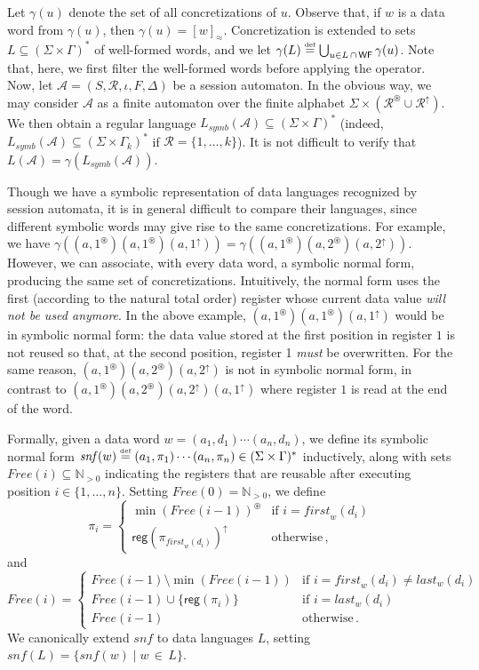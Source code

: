 \documentclass{LMCS}
\def\N{\ensuremath{\mathbb N}\xspace}
\def\Nz{\ensuremath{\N_{{}>0}}\xspace}
\newcommand\df{\ensuremath{\mathrel{\smash{\stackrel{\scriptscriptstyle{
    \text{def}}}{=}}}}}
\newcommand{\set}[1]{\{1,\ldots,#1\}}
\newcommand{\firstocc}[1]{\mathit{first}_{#1}}
\newcommand{\lastocc}[1]{\mathit{last}_{#1}}
\def\A{\mathcal A}
\newcommand{\Reg}{\mathcal{R}}
\newcommand{\rReg}{\Reg^\uparrow}
\newcommand{\gReg}{\Reg^\circledast}
\newcommand{\rreg}[1]{#1^\uparrow}
\newcommand{\gfresh}[1]{#1^\circledast}
\newcommand{\regof}[1]{\textsf{reg}(#1)}
\newcommand{\Reusable}{\mathit{Free}}
\newcommand{\fStates}{F}
\newcommand{\States}{S}
\newcommand{\init}{\iota}
\newcommand{\Trans}{\Delta}
\newcommand{\Nat}{\Gamma}
\newcommand{\kNat}[1]{\Gamma_{#1}}
\newcommand{\symbL}{L_\mathit{symb}}
\newcommand{\snf}{\mathit{snf}}
\newcommand{\DWords}{\gamma}
\newcommand{\DWordsof}[1]{\DWords(#1)}
\newcommand{\WF}{\mathsf{WF}}
\newcommand{\param}{\pi}
\begin{document}
Let $\DWordsof{u}$ denote the set of all concretizations of
$u$. Observe that, if $w$ is a data word from $\DWordsof u$, then
$\DWordsof u = [w]_{\approx}$. Concretization is extended to sets $L
\subseteq (\Sigma \times \Nat)^\ast$ of well-formed words, and we let
$\DWordsof{L} \df \bigcup_{u \in L \,\cap\, \WF} \DWordsof{u}$. Note
that, here, we first filter the well-formed words before applying the
operator.
Now, let $\A=(\States,\Reg,\init,\fStates,\Trans)$ be a session
automaton. In the obvious way, we may consider $\A$ as a finite
automaton over the finite alphabet $\Sigma \times (\gReg \cup
\rReg)$. We then obtain a regular language $\symbL(\A) \subseteq
(\Sigma \times \Nat)^\ast$ (indeed, $\symbL(\A) \subseteq (\Sigma
\times \kNat k)^\ast$ if $\Reg = \{1,\ldots,k\}$).  It is not
difficult to verify that $L(\A) = \DWordsof{\symbL(\A)}$.

Though we have a symbolic representation of data languages recognized
by session automata, it is in general difficult to compare their
languages, since different symbolic words may give rise to the
same concretizations. For example, we have
$\DWordsof{(a,\gfresh{1})(a,\gfresh{1})(a,\rreg{1})} =
\DWordsof{(a,\gfresh{1})(a,\gfresh{2})(a,\rreg{2})}$. However, we can
associate, with every data word, a symbolic normal form, producing
the same set of concretizations. Intuitively, the normal form uses the
first (according to the natural total order) register whose current
data value \emph{will not be used anymore}. In the above example,
$(a,\gfresh{1})(a,\gfresh{1})(a,\rreg{1})$ would be in symbolic normal
form: the data value stored at the first position in register $1$ is
not reused so that, at the second position, register 1 \emph{must} be
overwritten. For the same reason,
$(a,\gfresh{1})(a,\gfresh{2})(a,\rreg{2})$ is not in symbolic normal
form, in contrast to
$(a,\gfresh{1})(a,\gfresh{2})(a,\rreg{2})(a,\rreg{1})$ where register
$1$ is read at the end of the word.

Formally, given a data word $w=(a_1,d_1) \cdots (a_n,d_n)$, we define
its symbolic normal form $\snf(w) \df (a_1,\pi_1) \cdots (a_n,\pi_n)
\in (\Sigma \times \Nat)^\ast$ inductively, along with sets
$\Reusable(i) \subseteq \Nz$ indicating the registers that are reusable
after executing position $i \in \set{n}$. Setting $\Reusable(0) =
\Nz$, we define
\[\param_{i}=
\begin{cases}
\gfresh{\min(\Reusable(i-1))} & \text{if } i = \firstocc{w}(d_{i})\\
\rreg{\regof{\pi_{\firstocc{w}(d_{i})}}} & \text{otherwise}\,,
\end{cases}\] and
\[\Reusable(i)=
\begin{cases}
  \Reusable(i-1) \setminus \min(\Reusable(i-1)) & \text{if } i =
  \firstocc w(d_i) \neq \lastocc{w}(d_{i})\\
  \Reusable(i-1) \cup \{\regof{\param_i}\} & \text{if } i=\lastocc w(d_i) \\
  \Reusable(i-1) & \text{otherwise}\,.
\end{cases}\] We canonically extend $\snf$ to data languages $L$,
setting $\snf(L) = \{\snf(w) \mid w \,\in\, L\}$.
\end{document}

